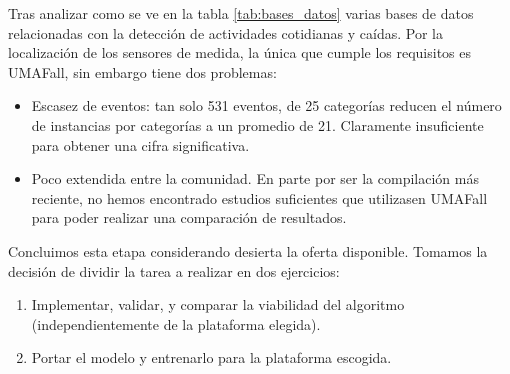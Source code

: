 Tras analizar como se ve en la tabla \ref{tab:bases_datos} varias bases de datos relacionadas con la detección de actividades cotidianas y caídas. Por la localización de los sensores de medida, la única que cumple los requisitos es UMAFall, sin embargo tiene dos problemas:
\begin{itemize}
  \item Escasez de eventos: tan solo 531 eventos, de 25 categorías reducen el número de instancias por categorías a un promedio de 21. Claramente insuficiente para obtener una cifra significativa.
  \item Poco extendida entre la comunidad. En parte por ser la compilación más reciente, no hemos encontrado estudios suficientes que utilizasen UMAFall para poder realizar una comparación de resultados.
\end{itemize}
Concluimos esta etapa considerando desierta la oferta disponible. Tomamos la decisión de dividir la tarea a realizar en dos ejercicios:
\begin{enumerate}
  \item Implementar, validar, y comparar la viabilidad del algoritmo (independientemente de la plataforma elegida).
  \item Portar el modelo y entrenarlo para la plataforma escogida. 
\end{enumerate}

